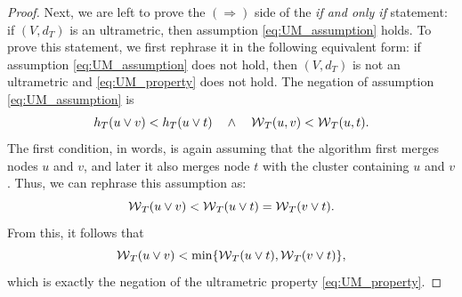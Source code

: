 \begin{proof}
Next, we are left to prove the $(\Rightarrow)$ side of the \emph{if and only if} statement: if $(V, d_{T})$ is an ultrametric, then assumption \ref{eq:UM_assumption} holds.
To prove this statement, we first rephrase it in the following equivalent form: if assumption \ref{eq:UM_assumption} does not hold, then $(V, d_{T})$ is not an ultrametric and \ref{eq:UM_property} does not hold. The negation of assumption \ref{eq:UM_assumption} is
\begin{equation}
h_T(u \vee v) < h_T(u \vee t) \quad \wedge \quad  \mathcal{W}{}_{T}(u,v) < \mathcal{W}{}_{T}(u,t).
\end{equation}
The first condition, in words, is again assuming that the algorithm first merges nodes $u$ and $v$, and later it also merges node $t$ with the cluster containing $u$ and $v$. Thus, we can rephrase this assumption as:
\begin{equation}
\mathcal{W}{}_{T}(u \vee v) < \mathcal{W}{}_{T}(u \vee t) = \mathcal{W}{}_{T}(v \vee t).
\end{equation}
From this, it follows that
\begin{equation}
\mathcal{W}{}_{T}(u \vee v) < \min \{\mathcal{W}{}_{T}(u \vee t), \mathcal{W}{}_{T}(v \vee t)\},
\end{equation}
which is exactly the negation of the ultrametric property \ref{eq:UM_property}.
\end{proof}

